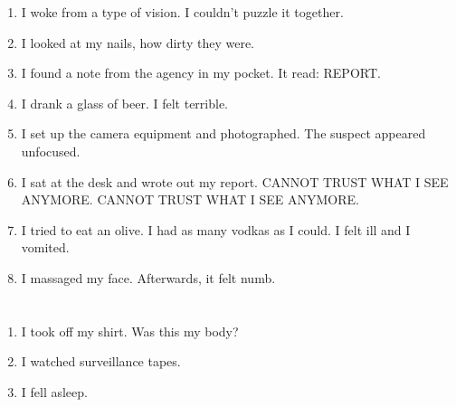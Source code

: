 \documentclass{article}
\begin{document}
    \begin{enumerate}
    
    \item I woke from a type of vision. I couldn't puzzle it together.\\
    
    \item I looked at my nails, how dirty they were.\\
    
    \item I found a note from the agency in my pocket. It read: REPORT.\\
    
    \item I drank a glass of beer. I felt terrible.\\
    
    \item I set up the camera equipment and photographed. The suspect appeared unfocused.\\
    
    \item I sat at the desk and wrote out my report. CANNOT TRUST WHAT I SEE ANYMORE. CANNOT TRUST WHAT I SEE ANYMORE.\\
    
    \item I tried to eat an olive. I had as many vodkas as I could. I felt ill and I vomited.\\
    
    \item I massaged my face. Afterwards, it felt numb.\\
    
    \end{enumerate}
     
    \newpage
    
    \section{}
    
    \begin{enumerate}
    
    \item I took off my shirt. Was this my body?\\
    
    \item I watched surveillance tapes.\\
    
    \item I fell asleep.\\
    
    \end{enumerate}
     
\end{document}

